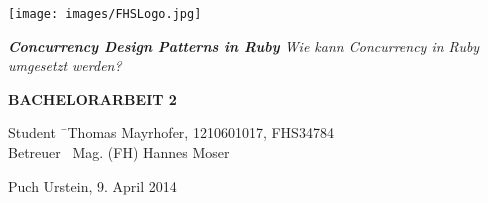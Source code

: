 \begin{titlepage}
\begin{center}

\texttt{[image: images/FHSLogo.jpg]}

\vspace*{4cm}

\Large{
	\textit{
		\textbf{Concurrency Design Patterns in Ruby} 
		\linebreak 
		Wie kann Concurrency in Ruby umgesetzt werden?
	}
}

\vspace*{4cm}

\large{
	\textbf{BACHELORARBEIT 2}
}

\end{center}

\vfill

\begin{tabbing}
Student \= \ Thomas Mayrhofer, 1210601017, FHS34784 \\
Betreuer \> \ Mag. (FH) Hannes Moser
\end{tabbing}

Puch Urstein, 9. April 2014

\end{titlepage}